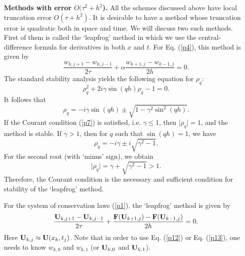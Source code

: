  
 
\textbf{Methods with error $O(\tau^2 +h^2$).} All the schemes
discussed above have local truncation error $O(\tau+h^2)$. It is
desirable to have a method whose truncation error is quadratic both
in space and time. We will discuss two such methods. First of them
is called the `leapfrog' method in which we use the
central-difference formula for derivatives in both $x$ and $t$. For
Eq. (\ref{p4}), this method is given by
\begin{equation}
\frac{w_{k,j+1}-w_{k,j-1}}{2\tau} + \alpha\frac{w_{k+1,j}-w_{k-1,j}}{2h}=0 . \label{p12}
\end{equation}
The standard stability analysis yields the following equation for $\rho_{q}$:
\[
\rho^2_{q}+2i\gamma\sin(qh)\rho_{q}-1=0.
\]
It follows that
\[
\rho_{q}=-i\gamma\sin(qh)\pm\sqrt{1-\gamma^2\sin^2(qh)}.
\]
If the Courant condition (\ref{p7}) is satisfied, i.e. $\gamma\leq 1$, then
$\vert \rho_{q}\vert=1$, and the method is stable. If $\gamma > 1$, then
for $q$ such that $\sin(qh)=1$, we have
\[
\rho_{q}=-i\gamma\pm i \sqrt{\gamma^2-1}.
\]
For the second root (with `minus' sign), we obtain
\[
\vert\rho_{q}\vert=\gamma+\sqrt{\gamma^2-1} > 1.
\]
Therefore, the Courant condition is the necessary and sufficient condition for stability of the
`leapfrog' method.


 
 
For the system of conservation laws (\ref{p1}), the `leapfrog' method is given by
\begin{equation}
\frac{{\bf U}_{k,j+1}-{\bf U}_{k,j-1}}{2\tau} +
\frac{{\bf F}({\bf U}_{k+1,j})-{\bf F}({\bf U}_{k-1,j})}{2h} =0. \label{p13}
\end{equation}
Here ${\bf U}_{k,j}\approx {\bf U}(x_{k},t_{j})$.
Note that in order to use Eq. (\ref{p12}) or Eq. (\ref{p13}), one needs to know
$w_{k,0}$ and $w_{k,1}$ (or ${\bf U}_{k,0}$ and ${\bf U}_{k,1}$).

 
 
